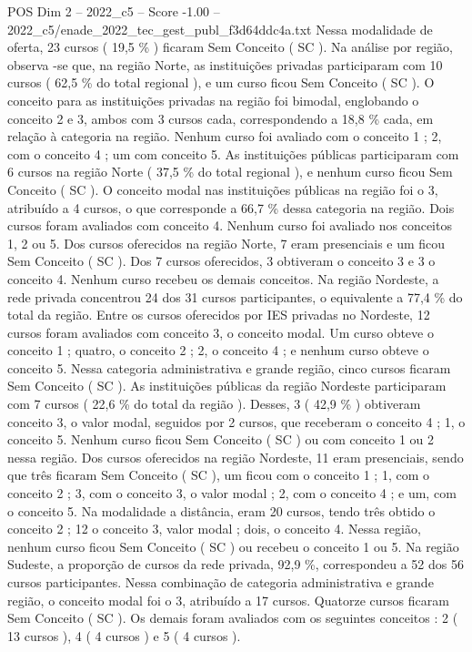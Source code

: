\begin{textsample}{POS Dim 2 – 2022\_c5 – Score -1.00 – 2022\_c5/enade\_2022\_tec\_gest\_publ\_f3d64ddc4a.txt}
Nessa modalidade de oferta, 23 cursos ( 19,5 \% ) ficaram Sem Conceito ( SC ).
Na análise por região, observa -se que, na região Norte, as instituições privadas participaram com 10 cursos ( 62,5 \% do total regional ), e um curso ficou Sem Conceito ( SC ).
O conceito para as instituições privadas na região foi bimodal, englobando o conceito 2 e 3, ambos com 3 cursos cada, correspondendo a 18,8 \% cada, em relação à categoria na região.
Nenhum curso foi avaliado com o conceito 1 ; 2, com o conceito 4 ; um com conceito 5.
As instituições públicas participaram com 6 cursos na região Norte ( 37,5 \% do total regional ), e nenhum curso ficou Sem Conceito ( SC ).
O conceito modal nas instituições públicas na região foi o 3, atribuído a 4 cursos, o que corresponde a 66,7 \% dessa categoria na região.
Dois cursos foram avaliados com conceito 4.
Nenhum curso foi avaliado nos conceitos 1, 2 ou 5.
Dos cursos oferecidos na região Norte, 7 eram presenciais e um ficou Sem Conceito ( SC ).
Dos 7 cursos oferecidos, 3 obtiveram o conceito 3 e 3 o conceito 4.
Nenhum curso recebeu os demais conceitos.
Na região Nordeste, a rede privada concentrou 24 dos 31 cursos participantes, o equivalente a 77,4 \% do total da região.
Entre os cursos oferecidos por IES privadas no Nordeste, 12 cursos foram avaliados com conceito 3, o conceito modal.
Um curso obteve o conceito 1 ; quatro, o conceito 2 ; 2, o conceito 4 ; e nenhum curso obteve o conceito 5.
Nessa categoria administrativa e grande região, cinco cursos ficaram Sem Conceito ( SC ).
As instituições públicas da região Nordeste participaram com 7 cursos ( 22,6 \% do total da região ).
Desses, 3 ( 42,9 \% ) obtiveram conceito 3, o valor modal, seguidos por 2 cursos, que receberam o conceito 4 ; 1, o conceito 5.
Nenhum curso ficou Sem Conceito ( SC ) ou com conceito 1 ou 2 nessa região.
Dos cursos oferecidos na região Nordeste, 11 eram presenciais, sendo que três ficaram Sem Conceito ( SC ), um ficou com o conceito 1 ; 1, com o conceito 2 ; 3, com o conceito 3, o valor modal ; 2, com o conceito 4 ; e um, com o conceito 5.
Na modalidade a distância, eram 20 cursos, tendo três obtido o conceito 2 ; 12 o conceito 3, valor modal ; dois, o conceito 4.
Nessa região, nenhum curso ficou Sem Conceito ( SC ) ou recebeu o conceito 1 ou 5.
Na região Sudeste, a proporção de cursos da rede privada, 92,9 \%, correspondeu a 52 dos 56 cursos participantes.
Nessa combinação de categoria administrativa e grande região, o conceito modal foi o 3, atribuído a 17 cursos.
Quatorze cursos ficaram Sem Conceito ( SC ).
Os demais foram avaliados com os seguintes conceitos : 2 ( 13 cursos ), 4 ( 4 cursos ) e 5 ( 4 cursos ).

\end{textsample}

